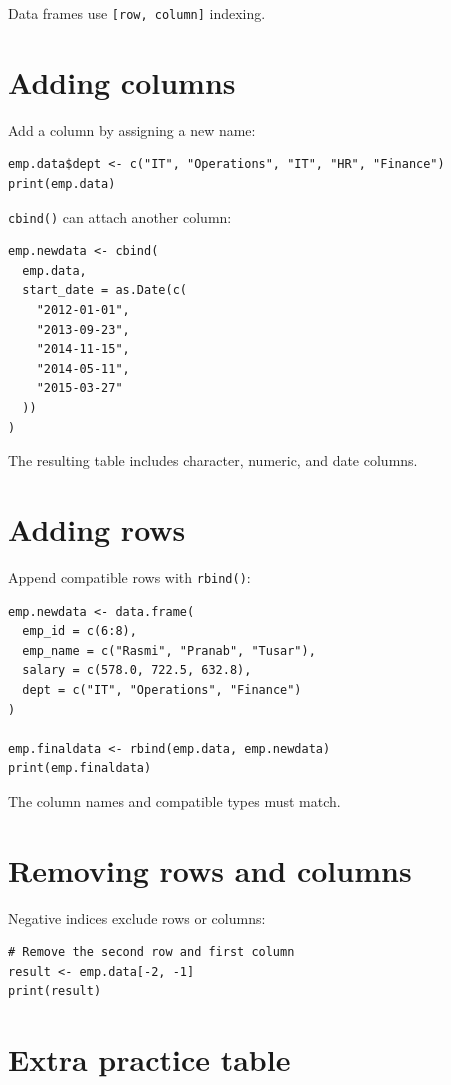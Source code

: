 Data frames use \texttt{[row, column]} indexing.

\section{Adding columns}

Add a column by assigning a new name:

\begin{lstlisting}[style=dsr]
emp.data$dept <- c("IT", "Operations", "IT", "HR", "Finance")
print(emp.data)
\end{lstlisting}

\texttt{cbind()} can attach another column:

\begin{lstlisting}[style=dsr]
emp.newdata <- cbind(
  emp.data,
  start_date = as.Date(c(
    "2012-01-01",
    "2013-09-23",
    "2014-11-15",
    "2014-05-11",
    "2015-03-27"
  ))
)
\end{lstlisting}

The resulting table includes character, numeric, and date columns.

\section{Adding rows}

Append compatible rows with \texttt{rbind()}:

\begin{lstlisting}[style=dsr]
emp.newdata <- data.frame(
  emp_id = c(6:8),
  emp_name = c("Rasmi", "Pranab", "Tusar"),
  salary = c(578.0, 722.5, 632.8),
  dept = c("IT", "Operations", "Finance")
)

emp.finaldata <- rbind(emp.data, emp.newdata)
print(emp.finaldata)
\end{lstlisting}

The column names and compatible types must match.

\section{Removing rows and columns}

Negative indices exclude rows or columns:

\begin{lstlisting}[style=dsr]
# Remove the second row and first column
result <- emp.data[-2, -1]
print(result)
\end{lstlisting}


\section{Extra practice table}

